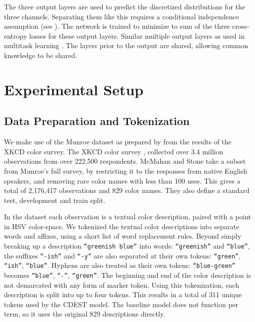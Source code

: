 \documentclass[11pt,a4paper]{article}
\newcommand{\parencite}{\citep}
\newcommand{\textcite}{\cite}
\begin{document}
The three output layers are used to predict the discretized distributions for the three channels.
Separating them like this requires a conditional independence assumption (see ).
The network is trained to minimize to sum of the three cross-entropy losses for these output layers.
Similar multiple output layers as used in multitask learning \parencite{caruana1997multitask,collobert2008unified}.
The layers prior to the output are shared, allowing common knowledge to be shared.


\section{Experimental Setup}\label{sec:experimental-setup}
\subsection{Data Preparation and Tokenization}\label{sec:data-preparation}
We make use of the  Munroe dataset as prepared by \textcite{mcmahan2015bayesian} from the results of the XKCD color survey.
The XKCD color survey \parencite{Munroe2010XKCDdataset}, collected over 3.4 million observations from over 222,500 respondents.
McMahan and Stone take a subset from Munroe's full survey, by restricting it to the responses from native English speakers, 
and removing rare color names with less than 100 uses.
This gives a total of 2,176,417 observations and 829 color names. 
They also define a standard test, development and train split.


In the dataset each observation is a textual color description, paired with a point in HSV color-space.
We tokenized the textual color descriptions into separate words and affixes, using a short list of word replacement rules.
Beyond simply breaking up a description \texttt{``greenish blue''} into words: \texttt{``greenish''} and \texttt{``blue''}, the suffixes \texttt{``-ish''} and \texttt{``-y''} are also separated at their own tokens: \texttt{``green''}, \texttt{``ish''}, \texttt{``blue''}.
Hyphens are also treated as their own tokens: \texttt{``blue-green''} becomes \texttt{``blue''}, \texttt{``-''}, \texttt{``green''}.
The beginning and end of the color description is not demarcated with any form of marker token.
Using this tokenization, each description is split into up to four tokens.
This results in a total of 311 unique tokens used by the CDEST model.
The baseline model does not function per term, so it uses the original 829 descriptions directly.
\end{document}
